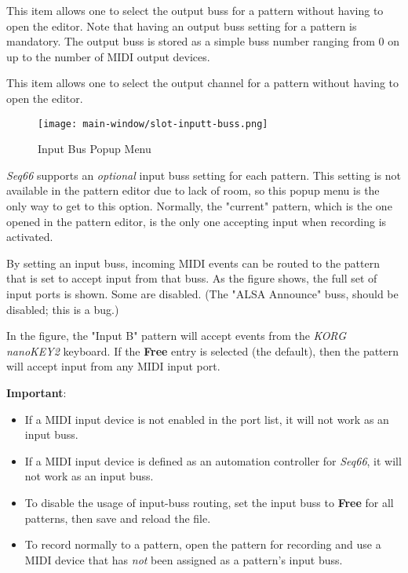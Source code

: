   This item allows one to select the output buss for a pattern without having
   to open the editor.
   Note that having an output buss setting for a pattern is mandatory.
   The output buss is stored as a simple buss number ranging from 0 on up to
   the number of MIDI output devices.

   This item allows one to select the output channel for a pattern without
   having to open the editor.

\begin{figure}[H]
   \centering 
   \texttt{[image: main-window/slot-inputt-buss.png]}
   \caption{Input Bus Popup Menu}
   \label{fig:slot_input_bus}
\end{figure}

   \textsl{Seq66} supports an
   \textsl{optional} input buss setting for each pattern.
   This setting is not available in the pattern editor due to lack
   of room, so this popup menu is the only way to get to this option.
   Normally, the "current" pattern, which is the one opened in
   the pattern editor, is the only one accepting input when
   recording is activated.

   By setting an input buss, incoming MIDI events can be routed to
   the pattern that is set to accept input from that buss.
   As the figure shows, the full set of input ports is shown.
   Some are disabled. (The "ALSA Announce" buss, should be disabled; this
   is a bug.)

   In the figure, the "Input B" pattern will accept events from
   the \textsl{KORG nanoKEY2} keyboard.
   If the \textbf{Free} entry is selected (the default), then
   the pattern will accept input from any MIDI input port.

   \textbf{Important}:
   \begin{itemize}
      \item If a MIDI input device is not enabled in the port list,
         it will not work as an input buss.
      \item If a MIDI input device is defined as an automation controller for
         \textsl{Seq66}, it will not work as an input buss.
      \item To disable the usage of input-buss routing, set the input buss
         to \textbf{Free} for all patterns, then save and reload the file.
      \item To record normally to a pattern, open the pattern for recording
         and use a MIDI device that has \textsl{not} been assigned as
         a pattern's input buss.
   \end{itemize}

